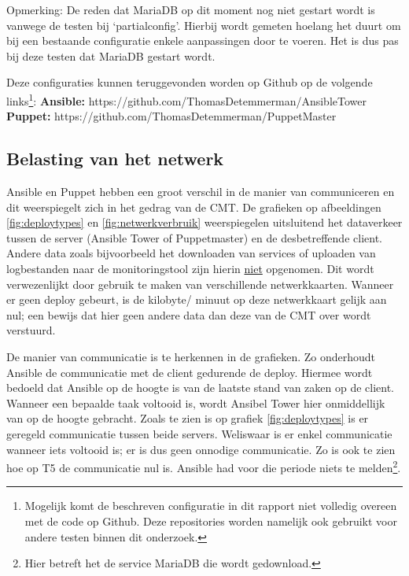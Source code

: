 Opmerking: De reden dat MariaDB op dit moment nog niet gestart wordt is vanwege de testen bij ‘\gls{partialconfig}'. Hierbij wordt gemeten hoelang het duurt om bij een bestaande configuratie enkele aanpassingen door te voeren. Het is dus pas bij deze testen dat MariaDB gestart wordt.


Deze configuraties kunnen teruggevonden worden op Github op de volgende links\footnote{Mogelijk komt de beschreven configuratie in dit rapport niet volledig overeen met de code op Github. Deze repositories worden namelijk ook gebruikt voor andere testen  binnen dit onderzoek.}:\newline
\textbf{Ansible:} https://github.com/ThomasDetemmerman/AnsibleTower \newline
\textbf{Puppet:} https://github.com/ThomasDetemmerman/PuppetMaster



\subsection{Belasting van het netwerk}
Ansible en Puppet hebben een groot verschil in de manier van communiceren en dit weerspiegelt zich in het gedrag van de \gls{CMT}. De grafieken op afbeeldingen \ref{fig:deploytypes} en \ref{fig:netwerkverbruik} weerspiegelen uitsluitend het dataverkeer tussen de server (Ansible Tower of Puppetmaster) en de desbetreffende client. Andere data zoals bijvoorbeeld het downloaden van services of uploaden van logbestanden naar de monitoringstool zijn hierin \underline{niet} opgenomen. Dit wordt verwezenlijkt door gebruik te maken van verschillende netwerkkaarten. Wanneer er geen deploy gebeurt, is de kilobyte/ minuut op deze netwerkkaart gelijk aan nul; een bewijs dat hier geen andere data dan deze van de \gls{CMT} over wordt verstuurd.  
	
De manier van communicatie is te herkennen in de grafieken. Zo onderhoudt Ansible de communicatie met de client gedurende de \gls{deploy}. Hiermee wordt bedoeld dat Ansible op de hoogte is van de laatste stand van zaken op de client. Wanneer een bepaalde taak voltooid is, wordt Ansibel Tower hier onmiddellijk van op de hoogte gebracht. Zoals te zien is op grafiek \ref{fig:deploytypes} is er geregeld communicatie tussen beide servers. Weliswaar is er enkel communicatie wanneer iets voltooid is; er is dus geen onnodige communicatie. Zo is ook te zien hoe op T5 de communicatie nul is. Ansible had voor die periode niets te melden\footnote{Hier betreft het de service MariaDB die wordt gedownload.}. 

